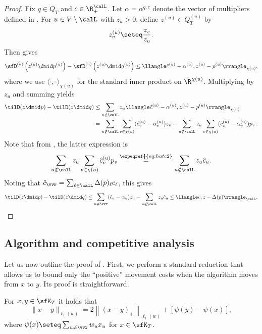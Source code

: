 \begin{proof}
	Fix $q \in Q_T$ and $c \in \R_+^{\calL}$.
	Let $\alpha = \alpha^{q,c}$ denote the vector of multipliers
	defined in .
	For $u \in V \setminus \calL$ with $z_u > 0$, define $z^{(u)} \in Q^{(u)}_T$ by
	\[
	z^{(u)}_v \seteq \frac{z_v}{z_u}. 
	\]
	Then  gives
	\[
	\sfD^{(u)}\left(z^{(u)} \dmid p^{(u)}\right) - \sfD^{(u)}\left(z^{(u)} \dmid q^{(u)}\right) \leq \llangle \hat{c}^{(u)} - \alpha^{(u)}, 
	z^{(u)} - p^{(u)}\rrangle_{\chi(u)},
	\]
	where we use $\langle \cdot,\cdot\rangle_{\chi(u)}$ for the standard inner product on $\R^{\chi(u)}$.
	Multiplying by $z_u$ and summing yields
	\begin{align*}
	\tilD(z \dmid p) - \tilD(z \dmid q) &\leq \sum_{u \notin \calL} z_u \llangle \hat{c}^{(u)} - \alpha^{(u)}, z^{(u)} - p^{(u)} \rrangle_{\chi(u)} \\
	&= \sum_{u \notin \calL} \sum_{v \in \chi(u)} (\hat{c}^{(u)}_v -\alpha^{(u)}_v) z_v - \sum_{u \notin \calL} z_u \sum_{v \in \chi(u)} (\hat{c}^{(u)}_v-\alpha^{(u)}_v) p_v\,.
	\end{align*}
	Note that from , the latter expression is
	\[
	\sum_{u \notin \calL} z_u \sum_{v \in \chi(u)} \hat{c}_v^{(u)} p_v
	\stackrel{\expeqref{\!\!\!}{eq:hatc2}}{=}\sum_{u \notin \calL} z_u \hat{c}_u.
	\]
	Noting that $\hat{c}_{\vvr} = \sum_{\ell \in \calL} \Delta(p)_{\ell} c_{\ell}$,  this gives
	\[
	\tilD(z \dmid p) - \tilD(z \dmid q) \leq \sum_{u \neq \vvr} (\hat{c}_u - \alpha_u) z_u - \sum_{u \notin \calL} z_u \hat{c}_u
	\leq \llangle c, z-\Delta(p)\rrangle_{\calL}. \qedhere
	\]
\end{proof}


\subsection{Algorithm and competitive analysis}
\label{sec:alg}

Let us now outline the proof of .
First, we perform a standard reduction that allows us to
bound only the ``positive'' movement costs when the algorithm
moves from $x$ to $y$.
Its proof is straightforward.

\begin{lemma}\label{lem:height}
	For $x,y\in \sfK_T$ it holds that
	\[
	\|x-y\|_{\ell_1(w)} = 2 \left\|(x-y)_{+}\right\|_{\ell_1(w)} + [\psi(y)-\psi(x)],
	\]
   where $\psi(x) \seteq \sum_{u \neq \vvr} w_u x_u$ for $x \in \sfK_T$.
\end{lemma}

